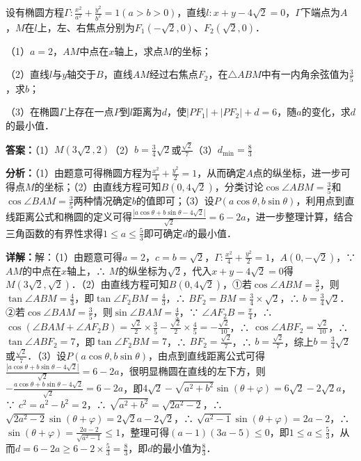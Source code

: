 \begin{question}[points=16]
设有椭圆方程$\Gamma:\frac{x^2}{a^2}+\frac{y^2}{b^2}=1(a>b>0)$，直线$l:x+y-4\sqrt{2}=0$，$\Gamma$下端点为$A$，$M$在$l$上，左、右焦点分别为$F_1(-\sqrt{2},0)$、$F_2(\sqrt{2},0)$．

（1）$a=2$，$AM$中点在$x$轴上，求点$M$的坐标；

（2）直线$l$与$y$轴交于$B$，直线$AM$经过右焦点$F_2$，在$\triangle ABM$中有一内角余弦值为$\frac{3}{5}$，求$b$；

（3）在椭圆$\Gamma$上存在一点$P$到$l$距离为$d$，使$|PF_1|+|PF_2|+d=6$，随$a$的变化，求$d$的最小值．
\begin{solution}
\textbf{答案：}（1）$M(3\sqrt{2},2)$（2）$b=\frac{3}{4}\sqrt{2}$或$\frac{\sqrt{2}}{7}$（3）$d_{\min}=\frac{8}{3}$

\textbf{分析：}（1）由题意可得椭圆方程为$\frac{x^2}{4}+\frac{y^2}{2}=1$，从而确定$A$点的纵坐标，进一步可得点$M$的坐标；（2）由直线方程可知$B(0,4\sqrt{2})$，分类讨论$\cos\angle ABM=\frac{3}{5}$和$\cos\angle BAM=\frac{3}{5}$两种情况确定$b$的值即可；（3）设$P(a\cos\theta,b\sin\theta)$，利用点到直线距离公式和椭圆的定义可得$\frac{|a\cos\theta+b\sin\theta-4\sqrt{2}|}{\sqrt{2}}=6-2a$，进一步整理计算，结合三角函数的有界性求得$1\leq a\leq\frac{5}{3}$即可确定$d$的最小值．

\textbf{详解：}解：（1）由题意可得$a=2$，$c=b=\sqrt{2}$，$\Gamma:\frac{x^2}{4}+\frac{y^2}{2}=1$，$A(0,-\sqrt{2})$，∵ $AM$的中点在$x$轴上，∴ $M$的纵坐标为$\sqrt{2}$，代入$x+y-4\sqrt{2}=0$得$M(3\sqrt{2},\sqrt{2})$．（2）由直线方程可知$B(0,4\sqrt{2})$，①若$\cos\angle ABM=\frac{3}{5}$，则$\tan\angle ABM=\frac{4}{3}$，即$\tan\angle F_2BM=\frac{4}{3}$，∴ $BF_2=BM=\frac{3}{4}\times\sqrt{2}$，∴ $b=\frac{3}{4}\sqrt{2}$．②若$\cos\angle BAM=\frac{3}{5}$，则$\sin\angle BAM=\frac{4}{5}$，∵ $\angle AF_2B=\frac{\pi}{4}$，∴ $\cos(\angle BAM+\angle AF_2B)=\frac{\sqrt{2}}{2}\times\frac{3}{5}-\frac{\sqrt{2}}{2}\times\frac{4}{5}=-\frac{\sqrt{2}}{10}$，∴ $\cos\angle ABF_2=\frac{\sqrt{2}}{10}$，∴ $\tan\angle ABF_2=7$，即$\tan\angle F_2BM=7$，∴ $BF_2=\frac{\sqrt{2}}{7}$，∴ $b=\frac{\sqrt{2}}{7}$，综上$b=\frac{3}{4}\sqrt{2}$或$\frac{\sqrt{2}}{7}$．（3）设$P(a\cos\theta,b\sin\theta)$，由点到直线距离公式可得$\frac{|a\cos\theta+b\sin\theta-4\sqrt{2}|}{\sqrt{2}}=6-2a$，很明显椭圆在直线的左下方，则$-\frac{a\cos\theta+b\sin\theta-4\sqrt{2}}{\sqrt{2}}=6-2a$，即$4\sqrt{2}-\sqrt{a^2+b^2}\sin(\theta+\varphi)=6\sqrt{2}-2\sqrt{2}a$，∵ $c^2=a^2-b^2=2$，∴ $\sqrt{a^2+b^2}=\sqrt{2a^2-2}$，∴ $\sqrt{2a^2-2}\sin(\theta+\varphi)=2\sqrt{2}a-2\sqrt{2}$，∴ $\sqrt{a^2-1}\sin(\theta+\varphi)=2a-2$，∴ $\sin(\theta+\varphi)=\frac{2a-2}{\sqrt{a^2-1}}\leq1$，整理可得$(a-1)(3a-5)\leq0$，即$1\leq a\leq\frac{5}{3}$，从而$d=6-2a\geq6-2\times\frac{5}{3}=\frac{8}{3}$，即$d$的最小值为$\frac{8}{3}$．
\end{solution}
\end{question}

